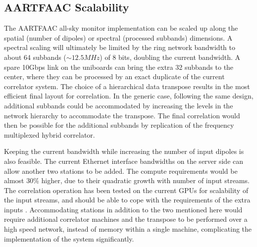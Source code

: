 \documentclass{ws-jai}
\begin{document}
\subsection   {AARTFAAC  Scalability}
The AARTFAAC all-sky  monitor implementation can be scaled up  along the spatial
(number  of dipoles)  or spectral  (processed subbands)  dimensions. A  spectral
scaling will  ultimately be limited  by the ring  network bandwidth to  about 64
subbands ($\sim12.5  MHz$) of 8 bits,  doubling the current bandwidth.   A spare
10Gbps link  on the  uniboards can bring  the extra 32  subbands to  the center,
where they  can be  processed by  an exact duplicate  of the  current correlator
system.   The choice  of  a  hierarchical data  transpose  results  in the  most
efficient final layout for correlation.  In the generic case, following the same
design, additional  subbands could be  accommodated by increasing the  levels in
the network hierarchy to accommodate the transpose.  The final correlation would
then be  possible for the  additional subbands  by replication of  the frequency
multiplexed hybrid correlator.

Keeping the  current bandwidth while increasing  the number of input  dipoles is
also feasible. The current Ethernet interface  bandwidths on the server side can
allow  another two  stations to  be added.   The compute  requirements would  be
almost 30\% higher, due to their  quadratic growth with number of input streams.
The correlation operation has been tested on the current GPUs for scalability of
the input streams, and should be able to cope with the requirements of the extra
inputs \cite {romein2016comparison}.  Accommodating  stations in addition to the
two  mentioned  here  would  require  additional  correlator  machines  and  the
transpose to be performed over a high  speed network, instead of memory within a
single machine, complicating the implementation of the system significantly.\\
\end{document}
